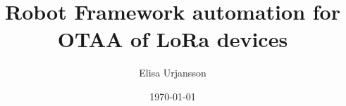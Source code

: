 
\def\thesislang{english} %

\def\secondlang{finnish} %

\author{Elisa Urjansson} %
\def\thesisfi{Insinöörityö}%
\def\thesisen{Thesis}

\def\alaotsikko{Alaotsikko/Subtitle} %

\def\otsikko{LoRa laitteiden autentikaation automatisointi langattomasti Robot Frameworkilla}
\def\tutkinto{Insinööri (AMK)} %
\def\kohjelma{Tieto\textendash ja viestintätekniikka}
\def\suuntautumis{Älykkäät järjestelmät}
\def\ohjaajat{
Projekti-insinööri Joseph Hotchkiss\newline
}
\def\avainsanat{avainsanat}
\def\pvm{\specialdate\today}

\title{Robot Framework automation for OTAA of LoRa devices}
\def\metropoliadegree {Bachelor of Engineering} %
\def\metropoliadegreeprogramme {Information and Communication Technology}
\def\metropoliaspecialisation {Smart Systems}
\def\metropoliainstructors {
Joseph Hotchkiss, Project Engineer\newline
}
\def\metropoliakeywords {Keywords}
\date{\longmonth\today}



